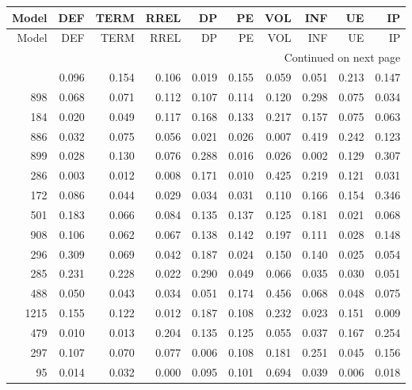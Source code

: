 \begin{longtable}{rrrrrrrrrr}
\label{tab:SSD_loss_30_loss_FP}\\
\toprule
 Model &   DEF &  TERM &  RREL &    DP &    PE &   VOL &   INF &    UE &    IP \\
\midrule
\endfirsthead

\toprule
 Model &   DEF &  TERM &  RREL &    DP &    PE &   VOL &   INF &    UE &    IP \\
\midrule
\endhead
\midrule
\multicolumn{10}{r}{{Continued on next page}} \\
\midrule
\endfoot

\bottomrule
\endlastfoot
   491 & 0.096 & 0.154 & 0.106 & 0.019 & 0.155 & 0.059 & 0.051 & 0.213 & 0.147 \\
   898 & 0.068 & 0.071 & 0.112 & 0.107 & 0.114 & 0.120 & 0.298 & 0.075 & 0.034 \\
   184 & 0.020 & 0.049 & 0.117 & 0.168 & 0.133 & 0.217 & 0.157 & 0.075 & 0.063 \\
   886 & 0.032 & 0.075 & 0.056 & 0.021 & 0.026 & 0.007 & 0.419 & 0.242 & 0.123 \\
   899 & 0.028 & 0.130 & 0.076 & 0.288 & 0.016 & 0.026 & 0.002 & 0.129 & 0.307 \\
   286 & 0.003 & 0.012 & 0.008 & 0.171 & 0.010 & 0.425 & 0.219 & 0.121 & 0.031 \\
   172 & 0.086 & 0.044 & 0.029 & 0.034 & 0.031 & 0.110 & 0.166 & 0.154 & 0.346 \\
   501 & 0.183 & 0.066 & 0.084 & 0.135 & 0.137 & 0.125 & 0.181 & 0.021 & 0.068 \\
   908 & 0.106 & 0.062 & 0.067 & 0.138 & 0.142 & 0.197 & 0.111 & 0.028 & 0.148 \\
   296 & 0.309 & 0.069 & 0.042 & 0.187 & 0.024 & 0.150 & 0.140 & 0.025 & 0.054 \\
   285 & 0.231 & 0.228 & 0.022 & 0.290 & 0.049 & 0.066 & 0.035 & 0.030 & 0.051 \\
   488 & 0.050 & 0.043 & 0.034 & 0.051 & 0.174 & 0.456 & 0.068 & 0.048 & 0.075 \\
  1215 & 0.155 & 0.122 & 0.012 & 0.187 & 0.108 & 0.232 & 0.023 & 0.151 & 0.009 \\
   479 & 0.010 & 0.013 & 0.204 & 0.135 & 0.125 & 0.055 & 0.037 & 0.167 & 0.254 \\
   297 & 0.107 & 0.070 & 0.077 & 0.006 & 0.108 & 0.181 & 0.251 & 0.045 & 0.156 \\
    95 & 0.014 & 0.032 & 0.000 & 0.095 & 0.101 & 0.694 & 0.039 & 0.006 & 0.018 \\

\end{longtable}
